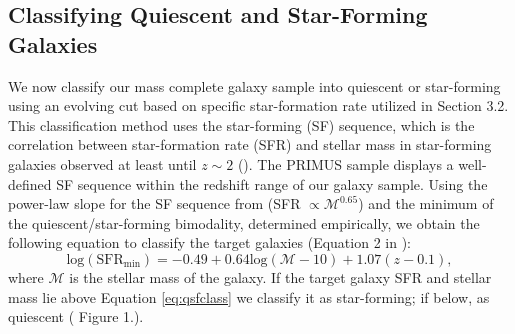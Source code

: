 \subsection{Classifying Quiescent and Star-Forming Galaxies} \label{sec:sfq}
We now classify our mass complete galaxy sample into quiescent or star-forming using an evolving cut based on specific star-formation rate utilized in \cite{Moustakas:2013aa} Section 3.2. This classification method uses the star-forming (SF) sequence, which is the correlation between star-formation rate (SFR) and stellar mass in star-forming galaxies observed at least until $z \sim 2$ (\citealt{Noeske:2007aa, Williams:2009aa, Karim:2011aa}). The PRIMUS sample displays a well-defined SF sequence within the redshift range of our galaxy sample. Using the power-law slope for the SF sequence from \cite{Salim:2007aa} (SFR $\propto \mathcal{M}^{0.65}$) and the minimum of the quiescent/star-forming bimodality, determined empirically, we obtain the following equation to classify the target galaxies (Equation 2 in \citealt{Moustakas:2013aa}):
\begin{equation} \label{eq:qsfclass} 
\mathrm{log}(\mathrm{SFR}_{\mathrm{min}}) = -0.49 + 0.64 \mathrm{log}(\mathcal{M} - 10) +1.07(z-0.1), 
\end{equation} 
where $\mathcal{M}$ is the stellar mass of the galaxy. If the target galaxy SFR and stellar mass lie above Equation \ref{eq:qsfclass} we classify it as star-forming; if below, as quiescent (\citealt{Moustakas:2013aa} Figure 1.).
